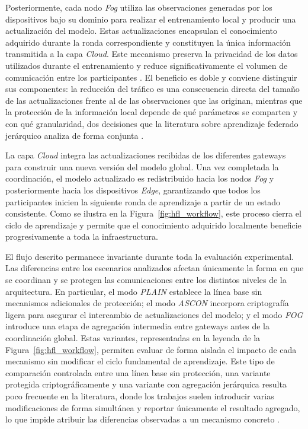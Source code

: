 \documentclass[journal,article,submit,moreauthors]{Definitions/mdpi}
\begin{document}
Posteriormente, cada nodo \textit{Fog} utiliza las observaciones generadas por los dispositivos bajo su dominio para realizar el entrenamiento local y producir una actualización del modelo. Estas actualizaciones encapsulan el conocimiento adquirido durante la ronda correspondiente y constituyen la única información transmitida a la capa \textit{Cloud}. Este mecanismo preserva la privacidad de los datos utilizados durante el entrenamiento y reduce significativamente el volumen de comunicación entre los participantes \cite{Hajj2023,Ficco2024}. El beneficio es doble y conviene distinguir sus componentes: la reducción del tráfico es una consecuencia directa del tamaño de las actualizaciones frente al de las observaciones que las originan, mientras que la protección de la información local depende de qué parámetros se comparten y con qué granularidad, dos decisiones que la literatura sobre aprendizaje federado jerárquico analiza de forma conjunta \cite{Ma2024,Dritsas2025}.

La capa \textit{Cloud} integra las actualizaciones recibidas de los diferentes gateways para construir una nueva versión del modelo global. Una vez completada la coordinación, el modelo actualizado es redistribuido hacia los nodos \textit{Fog} y posteriormente hacia los dispositivos \textit{Edge}, garantizando que todos los participantes inicien la siguiente ronda de aprendizaje a partir de un estado consistente. Como se ilustra en la Figura~\ref{fig:hfl_workflow}, este proceso cierra el ciclo de aprendizaje y permite que el conocimiento adquirido localmente beneficie progresivamente a toda la infraestructura.

El flujo descrito permanece invariante durante toda la evaluación experimental. Las diferencias entre los escenarios analizados afectan únicamente la forma en que se coordinan y se protegen las comunicaciones entre los distintos niveles de la arquitectura. En particular, el modo \textit{PLAIN} establece la línea base sin mecanismos adicionales de protección; el modo \textit{ASCON} incorpora criptografía ligera para asegurar el intercambio de actualizaciones del modelo; y el modo \textit{FOG} introduce una etapa de agregación intermedia entre gateways antes de la coordinación global. Estas variantes, representadas en la leyenda de la Figura~\ref{fig:hfl_workflow}, permiten evaluar de forma aislada el impacto de cada mecanismo sin modificar el ciclo fundamental de aprendizaje. Este tipo de comparación controlada entre una línea base sin protección, una variante protegida criptográficamente y una variante con agregación jerárquica resulta poco frecuente en la literatura, donde los trabajos suelen introducir varias modificaciones de forma simultánea y reportar únicamente el resultado agregado, lo que impide atribuir las diferencias observadas a un mecanismo concreto \cite{Alshammari2026,Cooray2025}.
\end{document}
